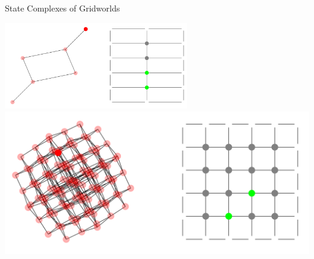 \documentclass[
    a0paper, %
    portrait, %
    fontscale=0.4 %
    ]{baposter}
\begin{document}
\begin{poster}
\begin{posterbox}[
    name = scgrid,  %
    column = 1, %
    span = 2,
    below = sc %
    ]{State Complexes of Gridworlds}
\begin{minipage}{0.3\textwidth}
\begin{center}
    \includegraphics[width=0.6\textwidth]{corridor-2.PNG}
    \includegraphics[width=1\textwidth]{box-4x4-2.PNG}
 \end{center}

\end{minipage}

\end{posterbox}


\end{poster}
\end{document}
